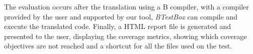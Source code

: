 \documentclass[runningheads]{llncs}
\begin{document}
The evaluation occurs after the translation using a B compiler, with a compiler provided by the user and supported by our tool, \textit{BTestBox} can compile and execute the translated code. Finally, a HTML report file is generated and presented to the user, displaying the coverage metrics, showing which coverage objectives are not reached and a shortcut for all the files used on the test.

\end{document}
